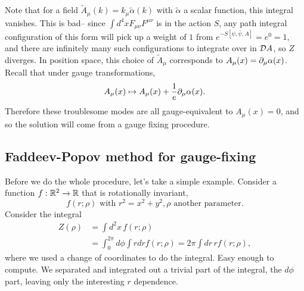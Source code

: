 Note that for a field $\tilde A_\mu(k)=k_\mu \tilde \alpha(k)$ with $\tilde \alpha$ a scalar function, this integral vanishes. This is bad-- since $\int d^4x F_{\mu\nu} F^{\mu\nu}$ is in the action $S$, any path integral configuration of this form will pick up a weight of $1$ from $e^{-S[\psi,\bar\psi,A]}=e^0=1$, and there are infinitely many such configurations to integrate over in $\mathcal{D} A$, so $Z$ diverges. In position space, this choice of $\tilde A_\mu$ corresponds to $A_\mu(x)=\partial_\mu\alpha(x)$.
Recall that under gauge transformations,
\begin{equation}
    A_\mu(x)\mapsto A_\mu(x) +\frac{1}{e} \partial_\mu \alpha(x).
\end{equation}
Therefore these troublesome modes are all gauge-equivalent to $A_\mu(x)=0$, and so the solution will come from a gauge fixing procedure.

\subsection*{Faddeev-Popov method for gauge-fixing} Before we do the whole procedure, let's take a simple example. Consider a function $f:\mathbb{R}^2\to \mathbb{R}$ that is rotationally invariant,
\begin{equation}
    f(r;\rho)\text{ with }r^2=x^2+y^2,\rho\text{ another parameter}.
\end{equation}
Consider the integral
\begin{align*}
    Z(\rho)&=\int d^2x\, f(r;\rho)\\
        &= \int_0^{2\pi} d\phi \int rdr f(r;\rho) =2\pi \int dr\, r f(r;\rho),
\end{align*}
where we used a change of coordinates to do the integral. Easy enough to compute. We separated and integrated out a trivial part of the integral, the $d\phi$ part, leaving only the interesting $r$ dependence.

